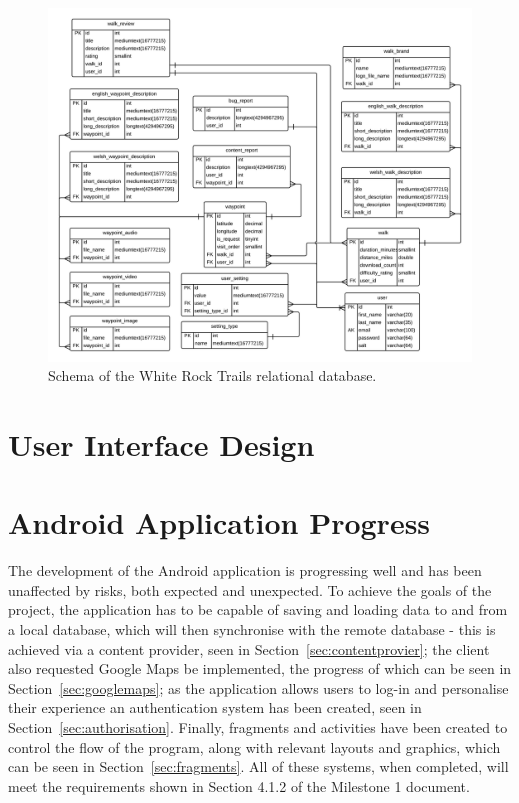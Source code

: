 \documentclass[11pt,a4paper]{article}
\begin{document}
\begin{figure}[H]
\centering
\includegraphics[angle=90, width=1\linewidth]{./img/DatabaseSchema}
\caption{Schema of the White Rock Trails relational database.}
\label{fig:DatabaseSchema}
\end{figure}


\section{User Interface Design}

\section{Android Application Progress}
The development of the Android application is progressing well and has been unaffected by risks, both expected and unexpected. To achieve the goals of the project, the application has to be capable of saving and loading data to and from a local database, which will then synchronise with the remote database - this is achieved via a content provider, seen in Section~\ref{sec:contentprovier}; the client also requested Google Maps be implemented, the progress of which can be seen in Section~\ref{sec:googlemaps}; as the application allows users to log-in and personalise their experience an authentication system has been created, seen in Section~\ref{sec:authorisation}. Finally, fragments and activities have been created to control the flow of the program, along with relevant layouts and graphics, which can be seen in Section~\ref{sec:fragments}. All of these systems, when completed, will meet the requirements shown in Section 4.1.2 of the Milestone 1 document. %
\end{document}

